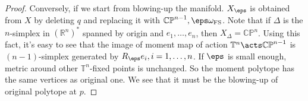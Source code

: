 \documentclass[12pt]{article}
\theoremstyle{plain}\newtheorem{theorem}{Theorem}
\theoremstyle{definition}\newtheorem{definition}[theorem]{Definition}
\theoremstyle{definition}\newtheorem{example}[theorem]{Example}
\theoremstyle{plain}\newtheorem{axiom}[theorem]{Axiom}
\theoremstyle{plain}\newtheorem{assertion}[theorem]{Assertion}
\theoremstyle{plain}\newtheorem{corollary}[theorem]{Corollary}
\theoremstyle{plain}\newtheorem{lemma}[theorem]{Lemma}
\theoremstyle{plain}\newtheorem{proposition}[theorem]{Proposition}
\theoremstyle{plain}\newtheorem{prop}[theorem]{Proposition}
\theoremstyle{plain}\newtheorem{conjecture}[theorem]{Conjecture}
\theoremstyle{plain}\newtheorem{conj}[theorem]{Conjecture}
\theoremstyle{plain}\newtheorem{problem}[theorem]{Problem}
\theoremstyle{remark}\newtheorem{notation}[theorem]{Notation}
\theoremstyle{definition}\newtheorem*{question}{Question}
\theoremstyle{definition}\newtheorem*{answer}{Answer}
\theoremstyle{definition}\newtheorem*{goal}{Goal}
\theoremstyle{plain}\newtheorem*{application}{Application}
\theoremstyle{plain}\newtheorem*{exercise}{Exercise}
\theoremstyle{remark}\newtheorem*{remark}{Remark}
\theoremstyle{remark}\newtheorem*{note}{\small{Note}}
\numberwithin{equation}{section}
\numberwithin{theorem}{section}
\numberwithin{figure}{section}
\begin{document}
\begin{proof}
Conversely, if we start from blowing-up the manifold. \(X_\eps\) is obtained from
\(X\) by deleting \(q\) and replacing it with \(\mathbb{CP}^{n-1},
\eps\omega_{\mathrm{FS}}\). Note that if \(\Delta\) is the \(n\)-simplex in 
\((\mathbb{R}^n)^*\) spanned by origin and \(e_1,\ldots,e_n\), then \(X_\Delta=
\mathbb{CP}^n\). Using this fact, it's easy to see that the image of moment map
of action \(\mathbb{T}^n\acts \mathbb{CP}^{n-1}\) is \((n-1)\)-simplex generated
by \(R_{\eps}e_i,i=1,\ldots,n\). If \(\eps\) is small enough, metric around other
\(\mathbb{T}^n\)-fixed points is unchanged. So the moment polytope has the same
vertices as original one. We see that it must be the blowing-up of original polytope
at \(p\).

\end{proof}

\nocite{*}
\printbibliography{}
\end{document}
